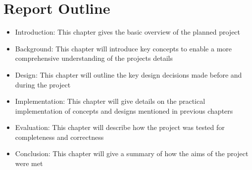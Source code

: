 \section{Report Outline}
\begin{itemize}
    \item Introduction: This chapter gives the basic overview of the planned project
    \item Background: This chapter will introduce key concepts to enable a more comprehensive understanding of the projects details
    \item Design: This chapter will outline the key design decisions made before and during the project
    \item Implementation: This chapter will give details on the practical implementation of concepts and designs mentioned in previous chapters
    \item Evaluation: This chapter will describe how the project was tested for completeness and correctness
    \item Conclusion: This chapter will give a summary of how the aims of the project were met 
\end{itemize}

